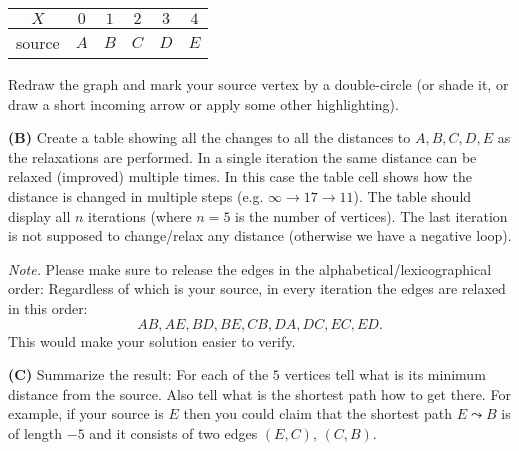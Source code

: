 \documentclass[a4paper,12pt]{article}
\begin{document}
\vspace{5pt}
\begin{tabular}{|c|c|c|c|c|c|} \hline
$X$ & $0$ & $1$ & $2$ & $3$ & $4$ \\ \hline
source & $A$ & $B$ & $C$ & $D$ & $E$  \\ \hline
\end{tabular}

\vspace{5pt}
Redraw the graph and mark your source vertex by a 
double-circle (or shade it, or draw a short incoming arrow 
or apply some other highlighting).

\vspace{10pt}
{\bf (B)} Create a table showing all the changes 
to all the distances to $A,B,C,D,E$ as the relaxations are performed. 
In a single iteration the same distance can be relaxed (improved) multiple times. 
In this case the table cell shows how the distance is changed in multiple steps
(e.g. $\infty \rightarrow 17 \rightarrow 11$).
The table should display all $n$ iterations (where $n=5$ is the number of vertices). 
The last iteration is not supposed to change/relax any distance (otherwise 
we have a negative loop).

{\em Note.} Please make sure to release the edges in the alphabetical/lexicographical order: 
Regardless of which is your source, in every iteration the edges are relaxed in this order: 
$$AB, AE, BD, BE, CB, DA, DC, EC, ED.$$
This would make your solution easier to verify.

\vspace{10pt}
{\bf (C)} Summarize the result: For each of the $5$ vertices 
tell what is its minimum distance from the source. 
Also tell what is the shortest path how to get there. 
For example, if your source is $E$ then you
could claim that the shortest path $E \leadsto B$ is 
of length $-5$ and it consists of two edges $(E,C)$, $(C,B)$. 
\end{document}
